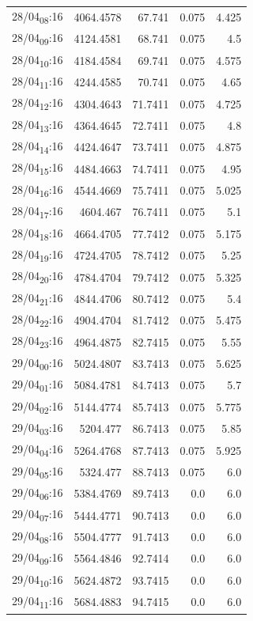 \documentclass[11pt]{article}
\begin{document}
\begin{table}[htbp]
\begin{tabular}{lrrrr}
28/04\textsubscript{08}:16 & 4064.4578 & 67.741 & 0.075 & 4.425\\[0pt]
28/04\textsubscript{09}:16 & 4124.4581 & 68.741 & 0.075 & 4.5\\[0pt]
28/04\textsubscript{10}:16 & 4184.4584 & 69.741 & 0.075 & 4.575\\[0pt]
28/04\textsubscript{11}:16 & 4244.4585 & 70.741 & 0.075 & 4.65\\[0pt]
28/04\textsubscript{12}:16 & 4304.4643 & 71.7411 & 0.075 & 4.725\\[0pt]
28/04\textsubscript{13}:16 & 4364.4645 & 72.7411 & 0.075 & 4.8\\[0pt]
28/04\textsubscript{14}:16 & 4424.4647 & 73.7411 & 0.075 & 4.875\\[0pt]
28/04\textsubscript{15}:16 & 4484.4663 & 74.7411 & 0.075 & 4.95\\[0pt]
28/04\textsubscript{16}:16 & 4544.4669 & 75.7411 & 0.075 & 5.025\\[0pt]
28/04\textsubscript{17}:16 & 4604.467 & 76.7411 & 0.075 & 5.1\\[0pt]
28/04\textsubscript{18}:16 & 4664.4705 & 77.7412 & 0.075 & 5.175\\[0pt]
28/04\textsubscript{19}:16 & 4724.4705 & 78.7412 & 0.075 & 5.25\\[0pt]
28/04\textsubscript{20}:16 & 4784.4704 & 79.7412 & 0.075 & 5.325\\[0pt]
28/04\textsubscript{21}:16 & 4844.4706 & 80.7412 & 0.075 & 5.4\\[0pt]
28/04\textsubscript{22}:16 & 4904.4704 & 81.7412 & 0.075 & 5.475\\[0pt]
28/04\textsubscript{23}:16 & 4964.4875 & 82.7415 & 0.075 & 5.55\\[0pt]
29/04\textsubscript{00}:16 & 5024.4807 & 83.7413 & 0.075 & 5.625\\[0pt]
29/04\textsubscript{01}:16 & 5084.4781 & 84.7413 & 0.075 & 5.7\\[0pt]
29/04\textsubscript{02}:16 & 5144.4774 & 85.7413 & 0.075 & 5.775\\[0pt]
29/04\textsubscript{03}:16 & 5204.477 & 86.7413 & 0.075 & 5.85\\[0pt]
29/04\textsubscript{04}:16 & 5264.4768 & 87.7413 & 0.075 & 5.925\\[0pt]
29/04\textsubscript{05}:16 & 5324.477 & 88.7413 & 0.075 & 6.0\\[0pt]
29/04\textsubscript{06}:16 & 5384.4769 & 89.7413 & 0.0 & 6.0\\[0pt]
29/04\textsubscript{07}:16 & 5444.4771 & 90.7413 & 0.0 & 6.0\\[0pt]
29/04\textsubscript{08}:16 & 5504.4777 & 91.7413 & 0.0 & 6.0\\[0pt]
29/04\textsubscript{09}:16 & 5564.4846 & 92.7414 & 0.0 & 6.0\\[0pt]
29/04\textsubscript{10}:16 & 5624.4872 & 93.7415 & 0.0 & 6.0\\[0pt]
29/04\textsubscript{11}:16 & 5684.4883 & 94.7415 & 0.0 & 6.0\\[0pt]
\end{tabular}
\end{table}
\end{document}
